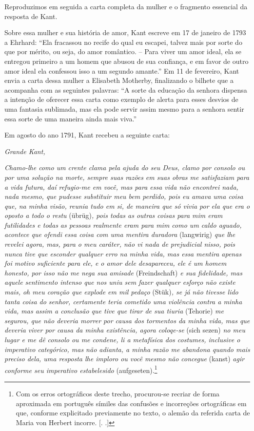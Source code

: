 Reproduzimos em seguida a carta completa da mulher e o fragmento
essencial da resposta de Kant.

Sobre essa mulher e sua história de amor, Kant escreve em 17 de janeiro
de 1793 a Ehrhard: ``Ela fracassou no recife do qual eu escapei, talvez
mais por sorte do que por mérito, ou seja, do amor romântico. -- Para
viver um amor ideal, ela se entregou primeiro a um homem que abusou de
sua confiança, e em favor de outro amor ideal ela confessou isso a um
segundo amante.'' Em 11 de fevereiro, Kant envia a carta dessa mulher a
Elisabeth Motherby, finalizando o bilhete que a acompanha com as
seguintes palavras: ``A sorte da educação da senhora dispensa a intenção
de oferecer essa carta como exemplo de alerta para esses desvios de uma
fantasia sublimada, mas ela pode servir assim mesmo para a senhora
sentir essa sorte de uma maneira ainda mais viva.''

Em agosto do ano 1791, Kant recebeu a seguinte carta:

\emph{Grande Kant,}

\emph{Chamo-lhe como um crente clama pela ajuda do seu Deus, clamo por
consolo ou por uma solução na morte, sempre suas razões em suas obras me
satisfaziam para a vida futura, daí refugio-me em você, mas para essa
vida não encontrei nada, nada mesmo, que pudesse substituir meu bem
perdido, pois eu amava uma coisa que, na minha visão, reunia tudo em si,
de maneira que só vivia por ela que era o oposto a todo o restu}
(übrüg)\emph{, pois todas as outras coisas para mim eram futilidades e
todas as pessoas realmente eram para mim como um caldo aguado, acontece
que ofendi essa coisa com uma mentira duradora} (langwirig) \emph{que
lhe revelei agora, mas, para o meu caráter, não vi nada de prejudicial
nisso, pois nunca tive que esconder qualquer erro na minha vida, mas
essa mentira apenas foi motivo suficiente para ele, e o amor dele
desapareceu, ele é um homem honesto, por isso não me nega sua amisade}
(Freindschaft) \emph{e sua fidelidade, mas aquele sentimento intenso que
nos uniu sem fazer qualquer esforço não existe mais, oh meu coração que
explode em mil pedaço} (Stük)\emph{, se já não tivesse lido tanta coisa
do senhor, certamente teria cometido uma violência contra a minha vida,
mas assim a conclusão que tive que tirar de sua tiuria} (Tehorie)
\emph{me segurou, que não deveria morrer por causa dos tormentos da
minha vida, mas que deveria viver por causa da minha existência, agora
coloqe-se} (sich sezen) \emph{no meu lugar e me dê consolo ou me
condene, li a metafísica dos costumes, inclusive o imperativo
categórico, mas não adianta, a minha razão me abandona quando mais
preciso dela, uma resposta lhe imploro ou você mesmo não concegue}
(kanst) \emph{agir conforme seu imperativo estabelesido}
(aufgeseten).\footnote{Com os erros ortográficos deste trecho,
  procurou-se recriar de forma aproximada em português símiles das
  confusões e incorreções ortográficas em que, conforme explicitado
  previamente no texto, o alemão da referida carta de Maria von Herbert
  incorre. [. .]}

